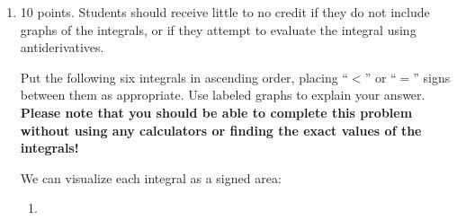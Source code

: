 \documentclass{article}
\begin{document}
\begin{enumerate}
\begin{enumerate}
    \end{enumerate}
  \probonly{}

\item

\begin{grading}
10 points. Students should receive little to no credit if they do not include graphs of the integrals, or if they attempt to evaluate the integral using antiderivatives.
\end{grading}

Put the following six integrals in ascending order, placing ``$<$'' or
  ``$=$'' signs between them as appropriate. Use labeled graphs to explain your answer. \textbf{Please note that you should be able to complete this problem without using any calculators or finding the exact values of the integrals!}

  

  \pspace{\newpage}

  \begin{solution} %
    We can visualize each integral as a signed area: 

    \begin{enumerate}
    \item 


\end{enumerate}
\end{solution}
\end{enumerate}
\end{document}

